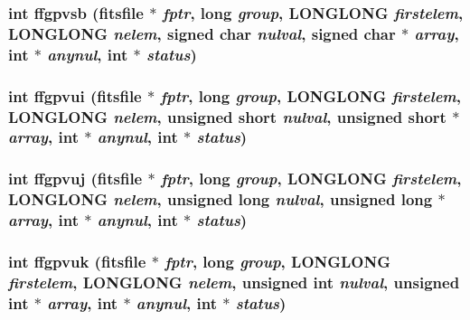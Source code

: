 \subsubsection{\setlength{\rightskip}{0pt plus 5cm}int ffgpvsb (\bf{fitsfile} $\ast$ {\em fptr}, long {\em group}, \bf{LONGLONG} {\em firstelem}, \bf{LONGLONG} {\em nelem}, signed char {\em nulval}, signed char $\ast$ {\em array}, int $\ast$ {\em anynul}, int $\ast$ {\em status})}\label{fitsio_8h_c16f3f63bcf3165ea08e680e0cf19f3a}


\subsubsection{\setlength{\rightskip}{0pt plus 5cm}int ffgpvui (\bf{fitsfile} $\ast$ {\em fptr}, long {\em group}, \bf{LONGLONG} {\em firstelem}, \bf{LONGLONG} {\em nelem}, unsigned short {\em nulval}, unsigned short $\ast$ {\em array}, int $\ast$ {\em anynul}, int $\ast$ {\em status})}\label{fitsio_8h_6f7dc3a158e748e6a3d31615a8ba9816}


\subsubsection{\setlength{\rightskip}{0pt plus 5cm}int ffgpvuj (\bf{fitsfile} $\ast$ {\em fptr}, long {\em group}, \bf{LONGLONG} {\em firstelem}, \bf{LONGLONG} {\em nelem}, unsigned long {\em nulval}, unsigned long $\ast$ {\em array}, int $\ast$ {\em anynul}, int $\ast$ {\em status})}\label{fitsio_8h_d3a92390525cbe896595a5e30e2c31cb}


\subsubsection{\setlength{\rightskip}{0pt plus 5cm}int ffgpvuk (\bf{fitsfile} $\ast$ {\em fptr}, long {\em group}, \bf{LONGLONG} {\em firstelem}, \bf{LONGLONG} {\em nelem}, unsigned int {\em nulval}, unsigned int $\ast$ {\em array}, int $\ast$ {\em anynul}, int $\ast$ {\em status})}\label{fitsio_8h_9d63a49944e89d4debca1080067ca58f}



